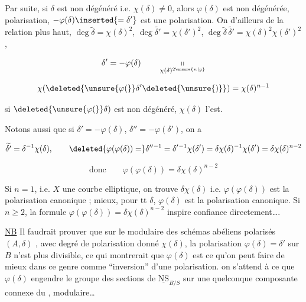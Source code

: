 
Par suite, si $\delta$ est non dégénéré i.e. $\chi(\delta)\ne0$, alors $\varphi(\delta)$ est non dégénérée,   polarisation, $-\varphi(\delta)\inserted{=\delta'}$ est une polarisation. On  d'ailleurs de la relation plus haut,  $\deg\widetilde\delta=\chi(\delta)^2$, $\deg\widetilde{\delta'}=\chi(\delta')^2$, $\deg\widetilde\delta\,\widetilde{\delta'}=\chi(\delta)^2\chi(\delta')^2$,

\[
\delta'=-\varphi(\delta)\qquad\underset{\chi(\delta)^{2\unsure{n|g}}}{\shortparallel}
\]


\[
\chi(\deleted{\unsure{\varphi(}}\delta'\deleted{\unsure{)}})=\chi(\delta)^{n-1}
\]

si $\deleted{\unsure{\varphi(}}\delta)$ est non dégénéré,  $\chi(\delta)$ l'est.

Notons aussi que si $\delta'=-\varphi(\delta)$, $\delta''=-\varphi(\delta')$, on a

\[
\widetilde{\delta'}=\delta^{-1}\chi(\delta),\qquad
\deleted{\varphi(\varphi(\delta))=}\delta''{}^{-1}=\delta'{}^{-1}\chi(\delta')=\delta\chi(\delta)^{-1}\chi(\delta')=\delta\chi(\delta)^{n-2}
\]

\[
\text{donc}\qquad\varphi(\varphi(\delta))=\delta\chi(\delta)^{n-2}
\]

Si  $n=1$, i.e. $X$ une courbe elliptique, on trouve  $\delta\chi(\delta)$ i.e. $\varphi(\varphi(\delta))$ est la polarisation canonique ; \deleted{[NB $\varphi($} mieux, pour tt $\delta$, $\varphi(\delta)$ est la polarisation canonique. Si $n\geq2$, la formule $\varphi(\varphi(\delta))=\delta\chi(\delta)^{n-2}$ inspire confiance directement\ldots.

\uline{NB} Il faudrait prouver que sur le    modulaire des schémas abéliens polarisés $(A,\delta)$ , avec degré de polarisation donné $\chi(\delta)$, la polarisation $\varphi(\delta)=\delta'$  sur $B$ n'est plus divisible,  ce qui montrerait que $\varphi(\delta)$ est ce qu'on peut faire de mieux dans ce genre comme ``inversion'' d'une polarisation.   on s'attend à ce que $\varphi(\delta)$ engendre le groupe  des sections de $\underline{\mathrm{NS}}_{B/S}$ sur une quelconque composante connexe du   , modulaire\ldots
